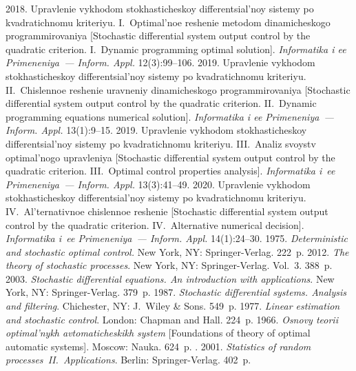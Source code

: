  \begin{multicols}{2}

\renewcommand{\bibname}{\protect\rmfamily References}

{\small\frenchspacing
 {%
 \begin{thebibliography}{99}


 2018. Upravlenie vykhodom 
stokhasticheskoy differentsial'noy sistemy po kvadratichnomu kriteriyu. 
I.~Optimal'noe reshenie metodom dinamicheskogo programmirovaniya 
[Stochastic differential system output control by the quadratic criterion. 
I.~Dynamic programming optimal solution]. \textit{Informatika i ee 
Primeneniya~--- Inform. Appl.} 12(3):99--106.
 2019. Upravlenie vykhodom 
stokhasticheskoy differentsial'noy sistemy po kvadratichnomu kriteriyu. 
II.~Chislennoe reshenie uravneniy dinamicheskogo programmirovaniya 
[Stochastic differential system output control by the quadratic criterion. 
II.~Dynamic programming equations numerical solution]. 
\textit{Informatika i ee Primeneniya~--- Inform. Appl.} 13(1):9--15.
 2019. Upravlenie vykhodom 
stokhasticheskoy differentsial'noy sistemy po kvadratichnomu kriteriyu. 
III.~Analiz svoystv optimal'nogo upravleniya [Stochastic differential system 
output control by the quadratic criterion. III.~Optimal control properties 
analysis]. \textit{Informatika i~ee Primeneniya~--- Inform. Appl.} 13(3):41--49.
 2020. Upravlenie vykhodom 
stokhasticheskoy differentsial'noy sistemy po kvadratichnomu kriteriyu. 
IV.~Al'ternativnoe chislennoe reshenie [Stochastic differential system 
output control by the quadratic criterion. IV.~Alternative numerical 
decision]. \textit{Informatika i~ee Primeneniya~--- Inform. Appl.} 14(1):24--30.
 1975. \textit{Deterministic and 
stochastic optimal control.} New York, NY: Springer-Verlag. 222~p.
 2012. \textit{The theory of 
stochastic processes}. New York, NY: Springer-Verlag. Vol.~3. 388~p.
 2003. \textit{Stochastic differential equations. 
An introduction with applications}. New York, NY: Springer-Verlag. 379~p.
 1987. \textit{Stochastic 
differential systems. Analysis and filtering}. Chichester, NY: J.~Wiley \& 
Sons. 549~p.
 1977. \textit{Linear estimation and stochastic 
control}. London: Chapman and Hall. 224~p.
 1966. \textit{Osnovy teorii optimal'nykh 
avtomaticheskikh system} [Foundations of theory of optimal automatic 
systems]. Moscow: Nauka. 624~p.
. 2001. \textit{Statistics of 
random processes~II.~Applications}. Berlin: Springer-Verlag. 402~p.
\end{thebibliography}

}}
\end{multicols}
